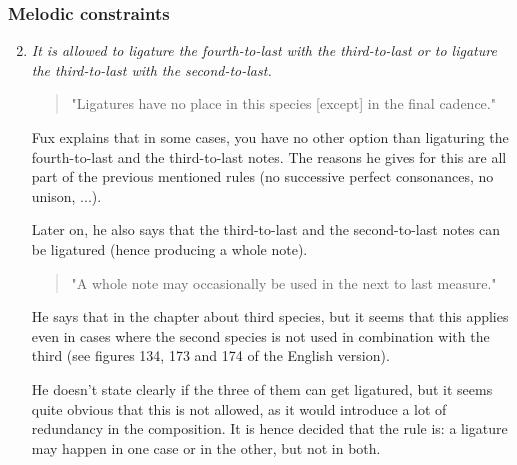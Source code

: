 \subsubsection{Melodic constraints}
\begin{enumerate}[wide, label=\bfseries 2.M\arabic*]
\setcounter{enumi}{1} %
    \item \textit{It is allowed to ligature the fourth-to-last with the third-to-last or to ligature the third-to-last with the second-to-last.} \label{rule:2nd-species-ligatures}    
    \begin{quotation}
        "Ligatures have no place in this species [except] in the final cadence."
        \textcite[p.87]{GaPEng}
    \end{quotation}
    Fux explains that in some cases, you have no other option than ligaturing the fourth-to-last and the third-to-last notes. The reasons he gives for this are all part of the previous mentioned rules (no successive perfect consonances, no unison, ...).

    Later on, he also says that the third-to-last and the second-to-last notes can be ligatured (hence producing a whole note).
    \begin{quotation}
        "A whole note may occasionally be used in the next to last measure."
        \textcite[p.93]{GaPEng}
    \end{quotation}
    He says that in the chapter about third species, but it seems that this applies even in cases where the second species is not used in combination with the third (see figures 134, 173 and 174 of the English version).

    He doesn't state clearly if the three of them can get ligatured, but it seems quite obvious that this is not allowed, as it would introduce a lot of redundancy in the composition. It is hence decided that the rule is: a ligature may happen in one case or in the other, but not in both.
\end{enumerate}

